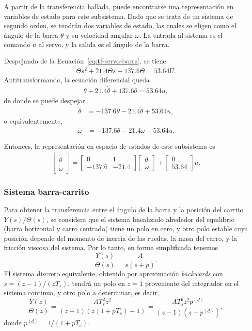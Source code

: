 A partir de la transferencia hallada, puede encontrarse una representación en variables de estado para este subsistema. Dado que se trata de un sistema de segundo orden, se tendrán dos variables de estado, las cuales se eligen como el ángulo de la barra $\theta$ y su velocidad angular $\omega$. La entrada al sistema es el comando $u$ al servo, y la salida es el ángulo de la barra.

Despejando de la Ecuación~\eqref{eq:tf-servo-barra}, se tiene
\begin{align*}
    \Theta s^2 + 21.4 \Theta s + 137.6 \Theta = 53.64 U.
\end{align*}
Antitransformando, la ecuación diferencial queda
\begin{align*}
    \ddot{\theta} + 21.4 \dot{\theta} + 137.6 \theta = 53.64 u,
\end{align*}
de donde se puede despejar
\begin{align*}
    \ddot{\theta} &= -137.6 \theta - 21.4 \dot{\theta} + 53.64 u,
\end{align*}
o equivalentemente,
\begin{align*}
    \dot{\omega} &= -137.6 \theta - 21.4 \omega + 53.64 u.
\end{align*}

Entonces, la representación en espacio de estados de este subsistema es
\begin{align*}
    \begin{bmatrix} \dot{\theta} \\ \dot{\omega} \end{bmatrix} =
        \begin{bmatrix} 0 & 1 \\ -137.6 & -21.4 \end{bmatrix} \begin{bmatrix} \theta \\ \omega \end{bmatrix}
        + \begin{bmatrix} 0 \\ 53.64 \end{bmatrix} u.
\end{align*}

\subsubsection{Sistema barra-carrito}

Para obtener la transferencia entre el ángulo de la barra y la posición del carrito $Y(s) / \Theta(s)$, se considera que el sistema linealizado alrededor del equilibrio (barra horizontal y carro centrado) tiene un polo en cero, y otro polo estable cuya posición depende del momento de inercia de las ruedas, la masa del carro, y la fricción viscosa del sistema. Por lo tanto, en forma simplificada tenemos
\[
    \frac{Y(s)}{\Theta(s)} = \frac{A}{s(s+p)}.
\]
El sistema discreto equivalente, obtenido por aproximación \emph{backwards} con $s = (z-1)/(z T_s)$, tendrá un polo en $z = 1$ proveniente del integrador en el sistema continuo, y otro polo a determinar, es decir,
\[
    \frac{Y(z)}{\Theta(z)} = \frac{A T_s^2 z^2}{(z - 1)(z (1 + p T_s) - 1)} = \frac{A T_s^2 z^2 p^{(d)}}{(z-1)(z-p^{(d)})},
\]
donde $p^{(d)} = 1/(1 + p T_s)$.

